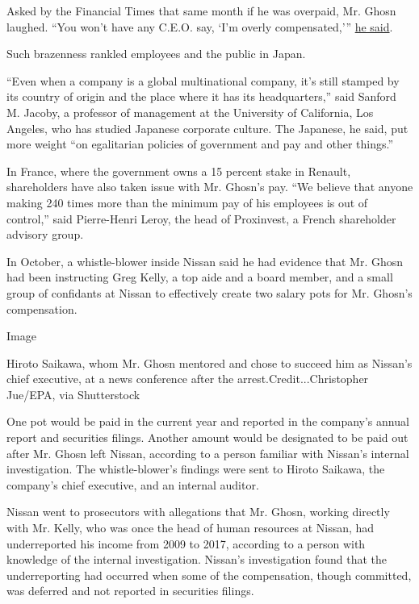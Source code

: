 Asked by the Financial Times that same month if he was overpaid, Mr.
Ghosn laughed. ``You won't have any C.E.O. say, `I'm overly
compensated,'''
\href{https://www.ft.com/content/e3acccf2-6e20-11e8-92d3-6c13e5c92914}{he
said}.

Such brazenness rankled employees and the public in Japan.

``Even when a company is a global multinational company, it's still
stamped by its country of origin and the place where it has its
headquarters,'' said Sanford M. Jacoby, a professor of management at the
University of California, Los Angeles, who has studied Japanese
corporate culture. The Japanese, he said, put more weight ``on
egalitarian policies of government and pay and other things.''

In France, where the government owns a 15 percent stake in Renault,
shareholders have also taken issue with Mr. Ghosn's pay. ``We believe
that anyone making 240 times more than the minimum pay of his employees
is out of control,'' said Pierre-Henri Leroy, the head of Proxinvest, a
French shareholder advisory group.

In October, a whistle-blower inside Nissan said he had evidence that Mr.
Ghosn had been instructing Greg Kelly, a top aide and a board member,
and a small group of confidants at Nissan to effectively create two
salary pots for Mr. Ghosn's compensation.

Image

Hiroto Saikawa, whom Mr. Ghosn mentored and chose to succeed him as
Nissan's chief executive, at a news conference after the
arrest.Credit...Christopher Jue/EPA, via Shutterstock

One pot would be paid in the current year and reported in the company's
annual report and securities filings. Another amount would be designated
to be paid out after Mr. Ghosn left Nissan, according to a person
familiar with Nissan's internal investigation. The whistle-blower's
findings were sent to Hiroto Saikawa, the company's chief executive, and
an internal auditor.

Nissan went to prosecutors with allegations that Mr. Ghosn, working
directly with Mr. Kelly, who was once the head of human resources at
Nissan, had underreported his income from 2009 to 2017, according to a
person with knowledge of the internal investigation. Nissan's
investigation found that the underreporting had occurred when some of
the compensation, though committed, was deferred and not reported in
securities filings.

